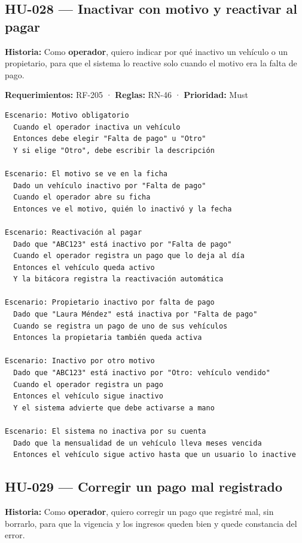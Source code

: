 \subsection{HU-028 — Inactivar con motivo y reactivar al pagar}

\textbf{Historia:} Como \textbf{operador}, quiero indicar por qué inactivo un vehículo o un propietario, para que el sistema lo reactive solo cuando el motivo era la falta de pago.


\textbf{Requerimientos:} RF-205 · \textbf{Reglas:} RN-46 · \textbf{Prioridad:} Must


\begin{lstlisting}[style=gherkin]
Escenario: Motivo obligatorio
  Cuando el operador inactiva un vehículo
  Entonces debe elegir "Falta de pago" u "Otro"
  Y si elige "Otro", debe escribir la descripción

Escenario: El motivo se ve en la ficha
  Dado un vehículo inactivo por "Falta de pago"
  Cuando el operador abre su ficha
  Entonces ve el motivo, quién lo inactivó y la fecha

Escenario: Reactivación al pagar
  Dado que "ABC123" está inactivo por "Falta de pago"
  Cuando el operador registra un pago que lo deja al día
  Entonces el vehículo queda activo
  Y la bitácora registra la reactivación automática

Escenario: Propietario inactivo por falta de pago
  Dado que "Laura Méndez" está inactiva por "Falta de pago"
  Cuando se registra un pago de uno de sus vehículos
  Entonces la propietaria también queda activa

Escenario: Inactivo por otro motivo
  Dado que "ABC123" está inactivo por "Otro: vehículo vendido"
  Cuando el operador registra un pago
  Entonces el vehículo sigue inactivo
  Y el sistema advierte que debe activarse a mano

Escenario: El sistema no inactiva por su cuenta
  Dado que la mensualidad de un vehículo lleva meses vencida
  Entonces el vehículo sigue activo hasta que un usuario lo inactive
\end{lstlisting}



\subsection{HU-029 — Corregir un pago mal registrado}

\textbf{Historia:} Como \textbf{operador}, quiero corregir un pago que registré mal, sin borrarlo, para que la vigencia y los ingresos queden bien y quede constancia del error.


